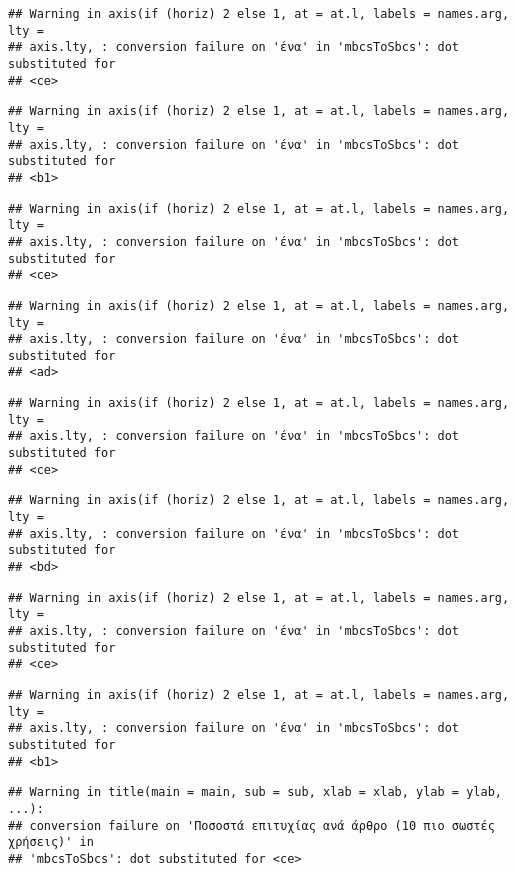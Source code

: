 \documentclass[
]{article}
\begin{document}
\begin{verbatim}
## Warning in axis(if (horiz) 2 else 1, at = at.l, labels = names.arg, lty =
## axis.lty, : conversion failure on 'ένα' in 'mbcsToSbcs': dot substituted for
## <ce>
\end{verbatim}

\begin{verbatim}
## Warning in axis(if (horiz) 2 else 1, at = at.l, labels = names.arg, lty =
## axis.lty, : conversion failure on 'ένα' in 'mbcsToSbcs': dot substituted for
## <b1>
\end{verbatim}

\begin{verbatim}
## Warning in axis(if (horiz) 2 else 1, at = at.l, labels = names.arg, lty =
## axis.lty, : conversion failure on 'ένα' in 'mbcsToSbcs': dot substituted for
## <ce>
\end{verbatim}

\begin{verbatim}
## Warning in axis(if (horiz) 2 else 1, at = at.l, labels = names.arg, lty =
## axis.lty, : conversion failure on 'ένα' in 'mbcsToSbcs': dot substituted for
## <ad>
\end{verbatim}

\begin{verbatim}
## Warning in axis(if (horiz) 2 else 1, at = at.l, labels = names.arg, lty =
## axis.lty, : conversion failure on 'ένα' in 'mbcsToSbcs': dot substituted for
## <ce>
\end{verbatim}

\begin{verbatim}
## Warning in axis(if (horiz) 2 else 1, at = at.l, labels = names.arg, lty =
## axis.lty, : conversion failure on 'ένα' in 'mbcsToSbcs': dot substituted for
## <bd>
\end{verbatim}

\begin{verbatim}
## Warning in axis(if (horiz) 2 else 1, at = at.l, labels = names.arg, lty =
## axis.lty, : conversion failure on 'ένα' in 'mbcsToSbcs': dot substituted for
## <ce>
\end{verbatim}

\begin{verbatim}
## Warning in axis(if (horiz) 2 else 1, at = at.l, labels = names.arg, lty =
## axis.lty, : conversion failure on 'ένα' in 'mbcsToSbcs': dot substituted for
## <b1>
\end{verbatim}

\begin{verbatim}
## Warning in title(main = main, sub = sub, xlab = xlab, ylab = ylab, ...):
## conversion failure on 'Ποσοστά επιτυχίας ανά άρθρο (10 πιο σωστές χρήσεις)' in
## 'mbcsToSbcs': dot substituted for <ce>
\end{verbatim}
\end{document}
